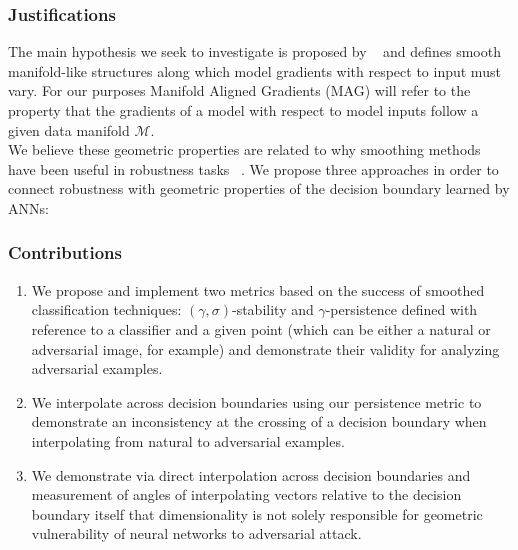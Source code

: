 \begin{frame}
  \frametitle{Justifications}

  The main hypothesis we seek to investigate is proposed by
  ~\citet{shamir2021dimpled} and defines smooth manifold-like
  structures along which model gradients with respect to input must
  vary.  For our purposes Manifold Aligned Gradients (MAG) will refer to the property that the gradients of a model with respect to model inputs follow a given data
  manifold $\mathcal{M}$. \\

 We believe these geometric properties are related
 to why smoothing methods have been useful in robustness tasks
 ~\citep{cohen2019certified, lecuyer2019certified, li2019certified}. We propose three approaches in order to connect robustness with geometric properties of the decision boundary learned by ANNs: 

\end{frame}

\begin{frame}
  \frametitle{Contributions}
 \begin{enumerate}
     \item We propose and implement two metrics based on the success of smoothed classification techniques:  $(\gamma,\sigma)$-stability and $\gamma$-persistence defined with reference to a classifier and a given point (which can be either a natural or adversarial image, for example) and demonstrate their validity for analyzing adversarial examples. 
     \item We interpolate across decision boundaries using our persistence metric to demonstrate an inconsistency at the crossing of a decision boundary when interpolating from natural to adversarial examples.
     \item We demonstrate via direct interpolation across decision boundaries and measurement of angles of interpolating vectors relative to the decision boundary itself that dimensionality is not solely responsible for geometric vulnerability of neural networks to adversarial attack. 
 \end{enumerate}
 \end{frame}



